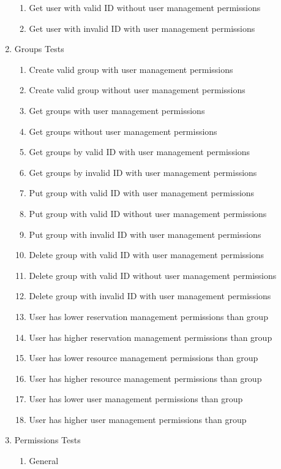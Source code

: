\documentclass[12pt]{article}
\begin{document}
\begin{enumerate}
\begin{enumerate}
        \item Get user with valid ID without user management permissions
        \item Get user with invalid ID with user management permissions
    \end{enumerate}
    \item Groups Tests
    \begin{enumerate}
        \item Create valid group with user management permissions
        \item Create valid group without user management permissions
        \item Get groups with user management permissions
        \item Get groups without user management permissions
        \item Get groups by valid ID with user management permissions
        \item Get groups by invalid ID with user management permissions
        \item Put group with valid ID with user management permissions
        \item Put group with valid ID without user management permissions
        \item Put group with invalid ID with user management permissions
        \item Delete group with valid ID with user management permissions
        \item Delete group with valid ID without user management permissions
        \item Delete group with invalid ID with user management permissions
        \item User has lower reservation management permissions than group
        \item User has higher reservation management permissions than group
        \item User has lower resource management permissions than group
        \item User has higher resource management permissions than group
        \item User has lower user management permissions than group
        \item User has higher user management permissions than group
    \end{enumerate}
    \item Permissions Tests
    \begin{enumerate}
        \item General

\end{enumerate}
\end{enumerate}
\end{document}
